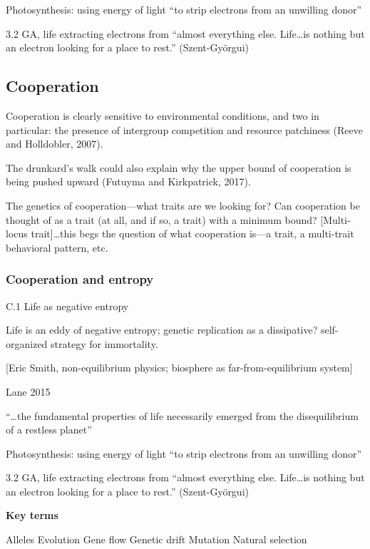 \documentclass{tufte-book} %
\begin{document}
Photosynthesis: using energy of light “to strip electrons from an unwilling donor”

3.2 GA, life extracting electrons from “almost everything else. Life…is nothing but an electron looking for a place to rest.” (Szent-Györgui)


\subsection{Cooperation}\label{arrow:cooperation}

Cooperation is clearly sensitive to environmental conditions, and two in particular: the presence of intergroup competition and resource patchiness (Reeve and Holldobler, 2007). 

The drunkard’s walk could also explain why the upper bound of cooperation is being pushed upward (Futuyma and Kirkpatrick, 2017). 

The genetics of cooperation—what traits are we looking for?
Can cooperation be thought of as a trait (at all, and if so, a trait) with a minimum bound? [Multi-locus trait]…this begs the question of what cooperation is—a trait, a multi-trait behavioral pattern, etc.


\subsubsection{Cooperation and entropy}

C.1 Life as negative entropy

Life is an eddy of negative entropy; genetic replication as a dissipative? self-organized strategy for immortality.

[Eric Smith, non-equilibrium physics; biosphere as far-from-equilibrium system]

Lane 2015

“…the fundamental properties of life necessarily emerged from the disequilibrium of a restless planet”

Photosynthesis: using energy of light “to strip electrons from an unwilling donor”

3.2 GA, life extracting electrons from “almost everything else. Life…is nothing but an electron looking for a place to rest.” (Szent-Györgui)


\textbf{Key terms}

Alleles
Evolution
Gene flow
Genetic drift
Mutation
Natural selection


\end{document}

